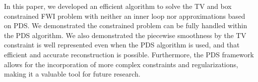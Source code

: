 In this paper, we developed an efficient algorithm to solve the TV and box constrained FWI problem with neither an inner loop nor approximations based on PDS.
We demonstrated the constrained problem can be fully handled within the PDS algorithm.
We also demonstrated the piecewise smoothness by the TV constraint is well represented even when the PDS algorithm is used, and that efficient and accurate reconstruction is possible.
Furthermore, the PDS framework allows for the incorporation of more complex constraints and regularizations, making it a valuable tool for future research.
